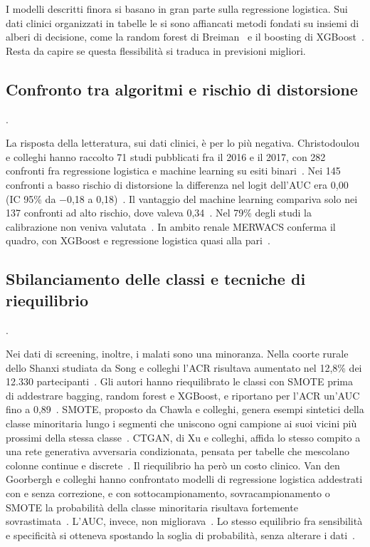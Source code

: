 \documentclass[a4paper, 12pt, oneside]{book}
\begin{document}
I modelli descritti finora si basano in gran parte sulla regressione logistica. Sui dati clinici organizzati in tabelle le si sono affiancati metodi fondati su insiemi di alberi di decisione, come la random forest di Breiman~\cite{breiman_random_2001} e il boosting di XGBoost~\cite{chen_xgboost_2016}. Resta da capire se questa flessibilità si traduca in previsioni migliori.

\subsection{Confronto tra algoritmi e rischio di distorsione}.

La risposta della letteratura, sui dati clinici, è per lo più negativa. Christodoulou e colleghi hanno raccolto 71 studi pubblicati fra il 2016 e il 2017, con 282 confronti fra regressione logistica e machine learning su esiti binari~\cite{christodoulou_systematic_2019}. Nei 145 confronti a basso rischio di distorsione la differenza nel logit dell'AUC era 0,00 (IC 95\% da $-$0,18 a 0,18)~\cite{christodoulou_systematic_2019}. Il vantaggio del machine learning compariva solo nei 137 confronti ad alto rischio, dove valeva 0,34~\cite{christodoulou_systematic_2019}. Nel 79\% degli studi la calibrazione non veniva valutata~\cite{christodoulou_systematic_2019}. In ambito renale MERWACS conferma il quadro, con XGBoost e regressione logistica quasi alla pari~\cite{yoo_merwacs_2026}.

\subsection{Sbilanciamento delle classi e tecniche di riequilibrio}.

Nei dati di screening, inoltre, i malati sono una minoranza. Nella coorte rurale dello Shanxi studiata da Song e colleghi l'ACR risultava aumentato nel 12,8\% dei 12.330 partecipanti~\cite{song_machine_2023}. Gli autori hanno riequilibrato le classi con SMOTE prima di addestrare bagging, random forest e XGBoost, e riportano per l'ACR un'AUC fino a 0,89~\cite{song_machine_2023}. SMOTE, proposto da Chawla e colleghi, genera esempi sintetici della classe minoritaria lungo i segmenti che uniscono ogni campione ai suoi vicini più prossimi della stessa classe~\cite{chawla_smote_2002}. CTGAN, di Xu e colleghi, affida lo stesso compito a una rete generativa avversaria condizionata, pensata per tabelle che mescolano colonne continue e discrete~\cite{xu_modeling_2019}. 
Il riequilibrio ha però un costo clinico. Van den Goorbergh e colleghi hanno confrontato modelli di regressione logistica addestrati con e senza correzione, e con sottocampionamento, sovracampionamento o SMOTE la probabilità della classe minoritaria risultava fortemente sovrastimata~\cite{van_den_goorbergh_harm_2022}. L'AUC, invece, non migliorava~\cite{van_den_goorbergh_harm_2022}. Lo stesso equilibrio fra sensibilità e specificità si otteneva spostando la soglia di probabilità, senza alterare i dati~\cite{van_den_goorbergh_harm_2022}.
\end{document}
